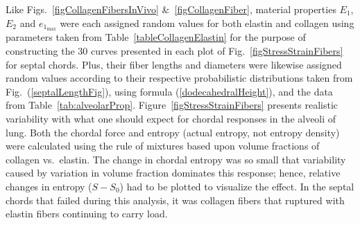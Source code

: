 Like Figs.~\ref{figCollagenFibersInVivo} \&\ \ref{figCollagenFiber}, material properties $E_1$, $E_2$ and $e_{1_{\max}}$ were each assigned random values for both elastin and collagen using parameters taken from Table~\ref{tableCollagenElastin} for the purpose of constructing the 30 curves presented in each plot of Fig.~\ref{figStressStrainFibers} for septal chords.  Plus, their fiber lengths and diameters were likewise assigned random values according to their respective probabilistic distributions taken from Fig.~(\ref{septalLengthFig}), using formula (\ref{dodecahedralHeight}), and the data from Table~\ref{tab:alveolarProp}.  Figure~\ref{figStressStrainFibers} presents realistic variability with what one should expect for chordal responses in the alveoli of lung.  Both the chordal force and entropy (actual entropy, not entropy density) were calculated using the rule of mixtures based upon volume fractions of collagen vs.\ elastin.  The change in chordal entropy was so small that variability caused by variation in volume fraction dominates this response; hence, relative changes in entropy ($S \! - \! S_0$) had to be plotted to visualize the effect.  In the septal chords that failed during this analysis, it was collagen fibers that ruptured with elastin fibers continuing to carry load.  

